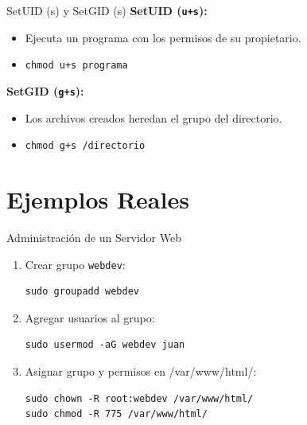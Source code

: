 \documentclass{beamer}
\begin{document}
\begin{frame}{SetUID (s) y SetGID (s)}
    \textbf{SetUID (\texttt{u+s}):}
    \begin{itemize}
        \item Ejecuta un programa con los permisos de su propietario.
        \item \texttt{chmod u+s programa}
    \end{itemize}
    \vspace{0.3cm}
    \textbf{SetGID (\texttt{g+s}):}
    \begin{itemize}
        \item Los archivos creados heredan el grupo del directorio.
        \item \texttt{chmod g+s /directorio}
    \end{itemize}
\end{frame}

\section{Ejemplos Reales}

\begin{frame}[fragile]{Administración de un Servidor Web}
    \begin{enumerate}
        \item Crear grupo \texttt{webdev}:
        \begin{lstlisting}
sudo groupadd webdev
        \end{lstlisting}
        \item Agregar usuarios al grupo:
        \begin{lstlisting}
sudo usermod -aG webdev juan
        \end{lstlisting}
        \item Asignar grupo y permisos en /var/www/html/:
        \begin{lstlisting}
sudo chown -R root:webdev /var/www/html/
sudo chmod -R 775 /var/www/html/
        \end{lstlisting}
    \end{enumerate}
\end{frame}
\end{document}
